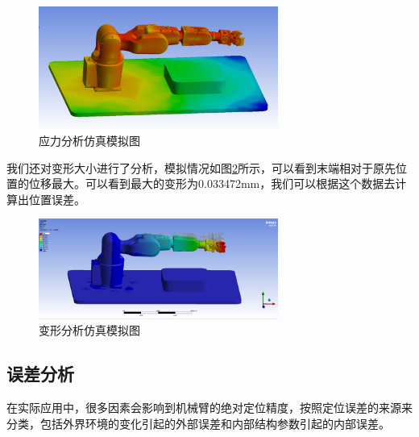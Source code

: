 \begin{figure}[h]
    \centering
    \includegraphics[width=0.7\textwidth]{Image/fig4.jpg}
    \caption{应力分析仿真模拟图}
    \label{fig:4}
\end{figure}

我们还对变形大小进行了分析，模拟情况如图\ref{fig:5}所示，可以看到末端相对于原先位置的位移最大。可以看到最大的变形为0.033472mm，我们可以根据这个数据去计算出位置误差。

\begin{figure}[h]
    \centering
    \includegraphics[width=0.7\textwidth]{Image/fig5.jpg}
    \caption{变形分析仿真模拟图}
    \label{fig:5}
\end{figure}

\subsection{误差分析}
在实际应用中，很多因素会影响到机械臂的绝对定位精度，按照定位误差的来源来分类，包括外界环境的变化引起的外部误差和内部结构参数引起的内部误差。

